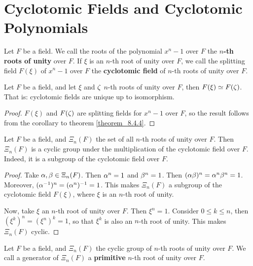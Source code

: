 \section{Cyclotomic Fields and Cyclotomic Polynomials}
\label{section_8.7}

\begin{definition}
  Let $F$ be a field. We call the roots of the polynomial $x^n-1$ over
  $F$ the \textbf{$n$-th roots of unity} over $F$. If  $\xi$ is an
  $n$-th root of unity over $F$, we call the splitting field $F(\xi)$
  of $x^n-1$ over $F$ the \textbf{cyclotomic field} of $n$-th roots of
  unity over $F$.
\end{definition}

\begin{proposition}\label{proposition_8.7.1}
  Let $F$ be a field, and let $\xi$ and $\zeta$  $n$-th roots of unity
  over $F$, then $F(\xi) \simeq F(\zeta)$. That is: cyclotomic fields are
  unique up to isomorphism.
\end{proposition}
\begin{proof}
  $F(\xi)$ and $F(\zeta)$ are splitting fields for $x^n-1$ over $F$, so
  the result follows from the corollary to theorem
  \ref{theorem_8.4.4}.
\end{proof}

\begin{proposition}\label{proposition_8.7.2}
  Let $F$ be a field, and $\Xi_n(F)$ the set of all $n$-th roots of
  unity over $F$. Then $\Xi_n(F)$ is a cyclic group under the
  multiplication of the cyclotomic field over $F$. Indeed, it is a
  subgroup of the cyclotomic field over $F$.
\end{proposition}
\begin{proof}
  Take $\alpha,\beta \in \Xi_n(F)$. Then $\alpha^n=1$ and $\beta^n=1$. Then
  $(\alpha\beta)^n=\alpha^n\beta^n=1$. Moreover, $(\alpha^{-1})^n=(\alpha^n)^{-1}=1$.
  This makes $\Xi_n(F)$ a subgroup of the cyclotomic field $F(\xi)$,
  where $\xi$ is an $n$-th root of unity.

  Now, take $\xi$ an $n$-th root of unity over $F$. Then $\xi^n=1$.
  Consider $0 \leq k \leq n$, then $(\xi^k)^n=(\xi^n)^k=1$, so
  that $\xi^k$ is also an $n$-th root of unity. This makes $\Xi_n(F)$
  cyclic.
\end{proof}

\begin{definition}
  Let $F$ be a field, and $\Xi_n(F)$ the cyclic group of $n$-th roots
  of unity over $F$. We call a generator of $\Xi_n(F)$ a
  \textbf{primitive} $n$-th root of unity over $F$.
\end{definition}

